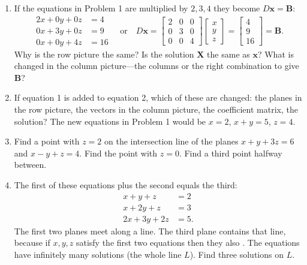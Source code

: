\documentclass[14pt, a4paper]{article}
\begin{document}
\begin{enumerate}
    \item If the equations in Problem 1 are multiplied by $2, 3, 4$ they become $D\boldsymbol{x} = \boldsymbol{B}$:
          \[
              \begin{aligned}
                  2x + 0y + 0z & = 4  \\
                  0x + 3y + 0z & = 9  \\
                  0x + 0y + 4z & = 16
              \end{aligned}
              \quad \text{or} \quad
              D\boldsymbol{x} =
              \begin{bmatrix}
                  2 & 0 & 0 \\
                  0 & 3 & 0 \\
                  0 & 0 & 4
              \end{bmatrix}
              \begin{bmatrix} x \\ y \\ z \end{bmatrix}
              =
              \begin{bmatrix} 4 \\ 9 \\ 16 \end{bmatrix}
              = \boldsymbol{B}.
          \]
          Why is the row picture the same? Is the solution $\boldsymbol{X}$ the same as $\boldsymbol{x}$? What is changed in the column picture—the columns or the right combination to give $\boldsymbol{B}$?

    \item If equation 1 is added to equation 2, which of these are changed: the planes in the row picture, the vectors in the column picture, the coefficient matrix, the solution? The new equations in Problem 1 would be $x = 2$, $x + y = 5$, $z = 4$.

    \item Find a point with $z = 2$ on the intersection line of the planes $x + y + 3z = 6$ and $x - y + z = 4$. Find the point with $z = 0$. Find a third point halfway between.

    \item The first of these equations plus the second equals the third:
          \[
              \begin{aligned}
                  x + y + z    & = 2  \\
                  x + 2y + z   & = 3  \\
                  2x + 3y + 2z & = 5.
              \end{aligned}
          \]
          The first two planes meet along a line. The third plane contains that line, because if $x, y, z$ satisfy the first two equations then they also \underline{\hspace{3cm}}. The equations have infinitely many solutions (the whole line $L$). Find three solutions on $L$.


\end{enumerate}
\end{document}
